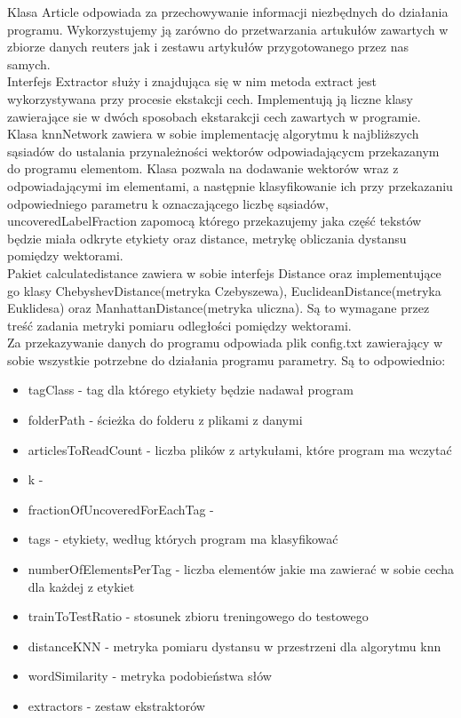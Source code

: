 \documentclass{classrep}
\begin{document}
Klasa Article odpowiada za przechowywanie informacji niezbędnych do działania programu. Wykorzystujemy ją zarówno do przetwarzania artukułów zawartych w zbiorze danych reuters jak i zestawu artykułów przygotowanego przez nas samych.\\
Interfejs Extractor służy i znajdująca się w nim metoda extract jest wykorzystywana przy procesie ekstakcji cech. Implementują ją liczne klasy zawierające sie w dwóch sposobach ekstarakcji cech zawartych w programie.\\
Klasa knnNetwork zawiera w sobie implementację algorytmu k najbliższych sąsiadów do ustalania przynależności wektorów odpowiadającycm przekazanym do programu elementom. Klasa pozwala na dodawanie wektorów wraz z odpowiadającymi im elementami, a następnie klasyfikowanie ich przy przekazaniu odpowiedniego parametru k oznaczającego liczbę sąsiadów, uncoveredLabelFraction zapomocą którego przekazujemy jaka część tekstów będzie miała odkryte etykiety oraz distance, metrykę obliczania dystansu pomiędzy wektorami.\\
Pakiet calculatedistance zawiera w sobie interfejs Distance oraz implementujące go klasy ChebyshevDistance(metryka Czebyszewa), EuclideanDistance(metryka Euklidesa) oraz ManhattanDistance(metryka uliczna). Są to wymagane przez treść zadania metryki pomiaru odległości pomiędzy wektorami.\\
Za przekazywanie danych do programu odpowiada plik config.txt zawierający w sobie wszystkie potrzebne do działania programu parametry. Są to odpowiednio:
\begin{itemize}
	\item tagClass - tag dla którego etykiety będzie nadawał program
	\item folderPath - ścieżka do folderu z plikami z danymi
	\item articlesToReadCount - liczba plików z artykułami, które program ma wczytać
	\item k - 
	\item fractionOfUncoveredForEachTag - 
	\item tags - etykiety, według których program ma klasyfikować
	\item numberOfElementsPerTag - liczba elementów jakie ma zawierać w sobie cecha dla każdej z etykiet
	\item trainToTestRatio - stosunek zbioru treningowego do testowego
	\item distanceKNN - metryka pomiaru dystansu w przestrzeni dla algorytmu knn
	\item wordSimilarity - metryka podobieństwa słów
	\item extractors - zestaw ekstraktorów
\end{itemize}
\end{document}
